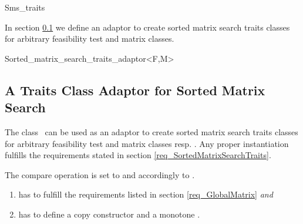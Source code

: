 \begin{ccAdvanced}
\begin{ccClass}{Sms_traits}
    \ccSeeAlso
    
    In section \ref{sec_SortedMatrixSearchTraitsAdaptor} we define an
    adaptor  to create
    sorted matrix search traits classes for arbitrary feasibility test
    and matrix classes.
    
    \ccTagDefaults
  \end{ccClass}
  
  \ccHtmlNoClassToc
  \begin{ccClassTemplate}{Sorted_matrix_search_traits_adaptor<F,M>}
    \ccTagFullDeclarations
    \subsection{A Traits Class Adaptor for Sorted Matrix Search}
    \label{sec_SortedMatrixSearchTraitsAdaptor}
    
    
    \ccDefinition The class \ccClassTemplateName\ can be used as an
    adaptor to create sorted matrix search traits classes for
    arbitrary feasibility test and matrix classes  resp.
    . Any proper instantiation fulfills the requirements stated
    in section \ref{req_SortedMatrixSearchTraits}.
    
    The compare operation  is set to
     and  accordingly to
    .
    

    \begin{enumerate}
    \item {} has to fulfill the requirements listed in section
      \ref{req_GlobalMatrix} \textit{and}
    \item {} has to define a copy constructor and a monotone
      .
    \end{enumerate}

    \ccCreation
    
    
    \ccTagDefaults
  \end{ccClassTemplate}
\end{ccAdvanced}

